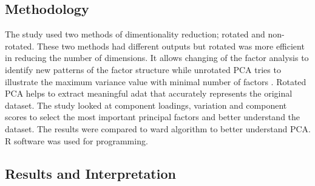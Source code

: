 \documentclass[12pt,a4paper]{article}
\begin{document}
\subsection{Methodology}
The study used two methods of dimentionality reduction; rotated and non-rotated. These two methods had different outputs but rotated was more efficient in reducing the number of dimensions. It allows changing of the factor analysis to identify new patterns of the factor structure while unrotated PCA tries to illustrate the maximum variance value with minimal number of factors \cite{jolliffe1990principal}. Rotated PCA helps to extract meaningful adat that accurately represents the original dataset. The study looked at component loadings, variation and component scores to select the most important principal factors and better understand the dataset. The results were compared to ward algorithm to better understand PCA. R software was used for programming.

\subsection{Results and Interpretation}
\end{document}
